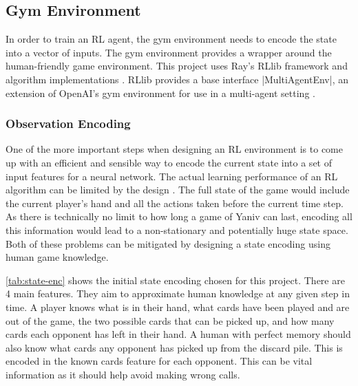 \documentclass[../main.tex]{subfiles}
\begin{document}
\subsection{Gym Environment}
In order to train an RL agent, the gym environment needs to encode the state into a vector of inputs. The gym environment provides a wrapper around the human-friendly game environment. This project uses Ray's RLlib framework and algorithm implementations \cite{liang_rllib_2018}. RLlib provides a base interface |MultiAgentEnv|, an extension of OpenAI's gym environment for use in a multi-agent setting \cite{brockman_openai_2016,seita_scaling_nodate}. 

\subsubsection{Observation Encoding}
One of the more important steps when designing an RL environment is to come up with an efficient and sensible way to encode the current state into a set of input features for a neural network. The actual learning performance of an RL algorithm can be limited by the design \cite{sutton_reinforcement_2018}. The full state of the game would include the current player's hand and all the actions taken before the current time step. As there is technically no limit to how long a game of Yaniv can last, encoding all this information would lead to a non-stationary and potentially huge state space. Both of these problems can be mitigated by designing a state encoding using human game knowledge. 

\autoref{tab:state-enc} shows the initial state encoding chosen for this project. There are 4 main features. They aim to approximate human knowledge at any given step in time. A player knows what is in their hand, what cards have been played and are out of the game, the two possible cards that can be picked up, and how many cards each opponent has left in their hand. A human with perfect memory should also know what cards any opponent has picked up from the discard pile. This is encoded in the known cards feature for each opponent. This can be vital information as it should help avoid making wrong calls. 
\end{document}
